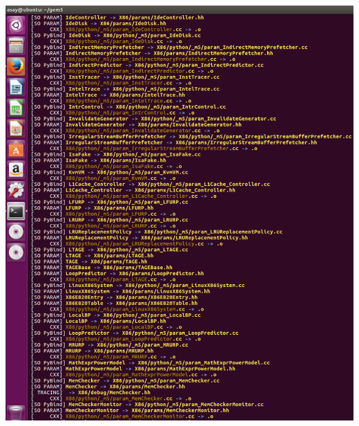 \documentclass{article}
\begin{document}
\begin{center}
	\includegraphics[width=1\textwidth]{build25}

\end{center}
\end{document}
